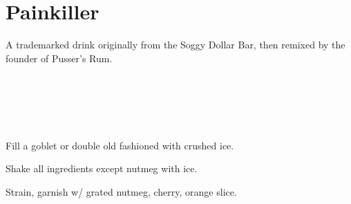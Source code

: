 \section[Painkiller]{Painkiller~}

\begin{recipestats}[
        servings=1,
        preptime=5~\minute,
        original=\citefield{pussersPainkiller}{shorttitle} \cite{pussersPainkiller}
    ]
\end{recipestats}

\begin{recipeabstract}
    A trademarked drink originally from the Soggy Dollar Bar, then remixed by
    the founder of Pusser's Rum.
\end{recipeabstract}

\begin{ingredientcolumns}[1]
    \begin{ingredientblock}
        \\
        \\
        \\
        \\
    \end{ingredientblock}
\end{ingredientcolumns}

\begin{preparation}
\item Fill a goblet or double old fashioned with crushed ice.
\item Shake all ingredients except nutmeg with ice.
\item Strain, garnish w/ grated nutmeg, cherry, orange slice.
\end{preparation}

\recipeend%
